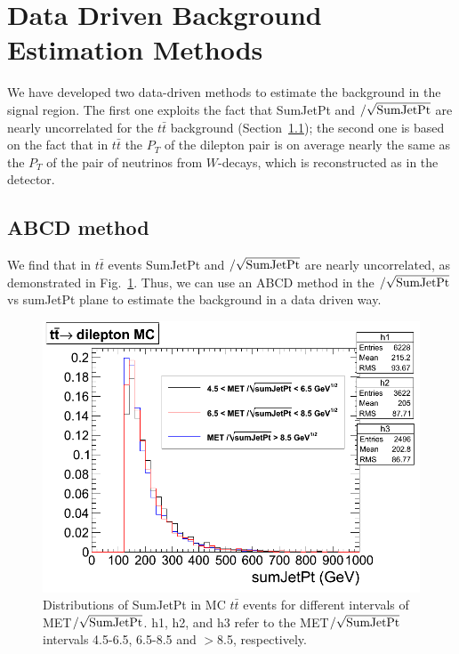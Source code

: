 \section{Data Driven Background Estimation Methods}
\label{sec:datadriven}
We have developed two data-driven methods to 
estimate the background in the signal region.
The first one exploits the fact that 
SumJetPt and \met$/\sqrt{\rm SumJetPt}$ are nearly 
uncorrelated for the $t\bar{t}$ background 
(Section~\ref{sec:abcd});  the second one 
is based on the fact that in $t\bar{t}$ the
$P_T$ of the dilepton pair is on average 
nearly the same as the $P_T$ of the pair of neutrinos
from $W$-decays, which is reconstructed as \met in the
detector.




\subsection{ABCD method}
\label{sec:abcd}

We find that in $t\bar{t}$ events SumJetPt and 
\met$/\sqrt{\rm SumJetPt}$ are nearly uncorrelated, 
as demonstrated in Fig.~\ref{fig:uncor}.
Thus, we can use an ABCD method in the \met$/\sqrt{\rm SumJetPt}$ vs
sumJetPt plane to estimate the background in a data driven way.


\begin{figure}[bht]
\begin{center}
\includegraphics[width=0.75\linewidth]{uncor.png}
\caption{\label{fig:uncor}\protect Distributions of SumJetPt 
in MC $t\bar{t}$ events for different intervals of 
MET$/\sqrt{\rm SumJetPt}$. h1, h2, and h3 refer to the MET$/\sqrt{\rm SumJetPt}$
intervals 4.5-6.5, 6.5-8.5 and $>$8.5, respectively. }
\end{center}
\end{figure}

